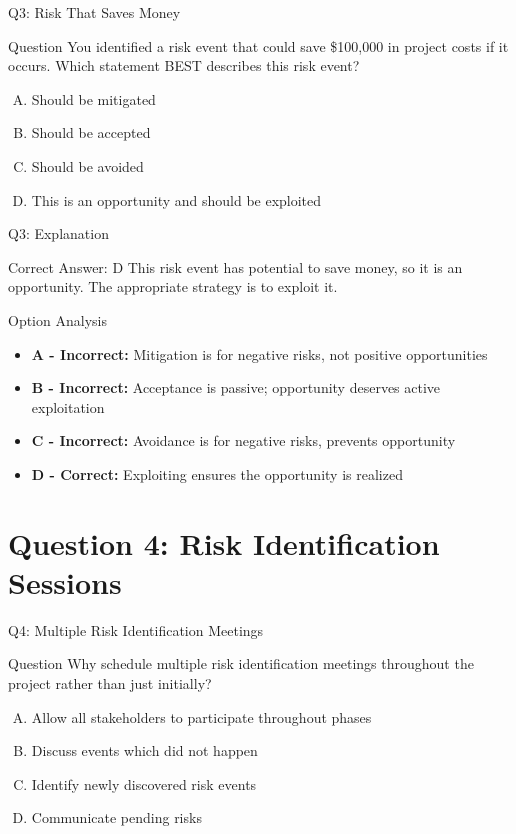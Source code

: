 \documentclass{beamer}
\begin{document}
	\begin{frame}{Q3: Risk That Saves Money}
		\begin{block}{Question}
			You identified a risk event that could save \$100,000 in project costs if it occurs. Which statement BEST describes this risk event?
		\end{block}
		\begin{enumerate}[(A)]
			\item Should be mitigated
			\item Should be accepted
			\item Should be avoided
			\item This is an opportunity and should be exploited
		\end{enumerate}
	\end{frame}
	
	\begin{frame}{Q3: Explanation}
		\begin{block}{Correct Answer: D}
			This risk event has potential to save money, so it is an opportunity. The appropriate strategy is to exploit it.
		\end{block}
		\begin{block}{Option Analysis}
			\begin{itemize}
				\item \textbf{A - Incorrect:} Mitigation is for negative risks, not positive opportunities
				\item \textbf{B - Incorrect:} Acceptance is passive; opportunity deserves active exploitation
				\item \textbf{C - Incorrect:} Avoidance is for negative risks, prevents opportunity
				\item \textbf{D - Correct:} Exploiting ensures the opportunity is realized
			\end{itemize}
		\end{block}
	\end{frame}
	
	\section{Question 4: Risk Identification Sessions}
	
	\begin{frame}{Q4: Multiple Risk Identification Meetings}
		\begin{block}{Question}
			Why schedule multiple risk identification meetings throughout the project rather than just initially?
		\end{block}
		\begin{enumerate}[(A)]
			\item Allow all stakeholders to participate throughout phases
			\item Discuss events which did not happen
			\item Identify newly discovered risk events
			\item Communicate pending risks
		\end{enumerate}
	\end{frame}
	
\end{document}
